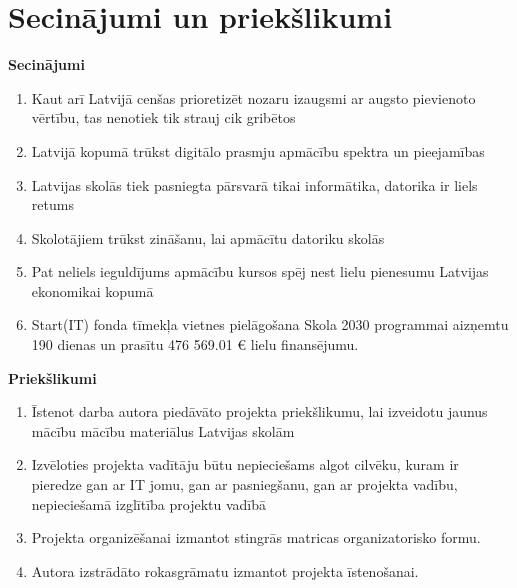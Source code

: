 \chapter*{Secinājumi un priekšlikumi}
\textbf{Secinājumi}
\begin{enumerate}
  \item Kaut arī Latvijā cenšas prioretizēt nozaru izaugsmi ar augsto pievienoto vērtību,
  tas nenotiek tik strauj cik gribētos
  \item Latvijā kopumā trūkst digitālo prasmju apmācību spektra un pieejamības
  \item Latvijas skolās tiek pasniegta pārsvarā tikai informātika, datorika ir liels retums
  \item Skolotājiem trūkst zināšanu, lai apmācītu datoriku skolās
  \item Pat neliels ieguldījums apmācību kursos spēj nest lielu pienesumu Latvijas ekonomikai kopumā
  \item Start(IT) fonda tīmekļa vietnes pielāgošana Skola 2030 programmai aizņemtu 190 dienas un
  prasītu 476 569.01 € lielu finansējumu.
\end{enumerate}
\textbf{Priekšlikumi}
\begin{enumerate}
  \item Īstenot darba autora piedāvāto projekta priekšlikumu, lai izveidotu jaunus mācību
  mācību materiālus Latvijas skolām
  \item Izvēloties projekta vadītāju būtu nepieciešams algot cilvēku, kuram ir pieredze gan
  ar IT jomu, gan ar pasniegšanu, gan ar projekta vadību, nepieciešamā izglītība projektu vadībā
  \item Projekta organizēšanai izmantot stingrās matricas organizatorisko formu.
  \item Autora izstrādāto rokasgrāmatu izmantot projekta īstenošanai.
\end{enumerate}
